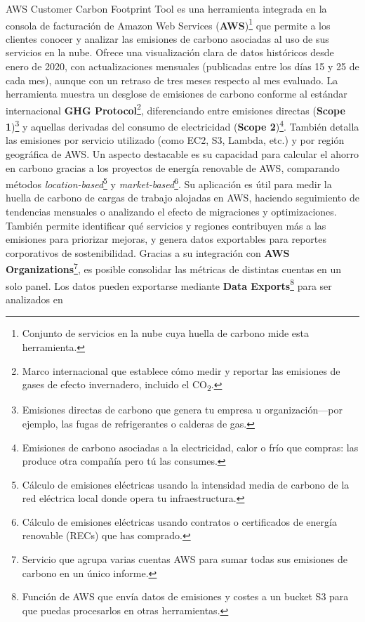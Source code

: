 \documentclass[12pt,a4paper]{report}
\begin{document}
AWS Customer Carbon Footprint Tool es una herramienta integrada en la consola
de facturación de Amazon Web Services (\textbf{AWS})\footnote{Conjunto de servicios en la nube cuya huella de carbono mide esta herramienta.} que permite a los clientes
conocer y analizar las emisiones de carbono asociadas al uso de sus servicios
en la nube. Ofrece una visualización clara de datos históricos desde enero de
2020, con actualizaciones mensuales (publicadas entre los días 15 y 25 de cada
mes), aunque con un retraso de tres meses respecto al mes evaluado. La
herramienta muestra un desglose de emisiones de carbono conforme al estándar
internacional \textbf{GHG Protocol}\footnote{Marco internacional que establece cómo medir y reportar las emisiones de gases de efecto invernadero, incluido el CO\textsubscript{2}.}, diferenciando entre emisiones directas
(\textbf{Scope 1})\footnote{Emisiones directas de carbono que genera tu empresa u organización—por ejemplo, las fugas de refrigerantes o calderas de gas.} y aquellas derivadas del consumo de electricidad
(\textbf{Scope 2})\footnote{Emisiones de carbono asociadas a la electricidad, calor o frío que compras: las produce otra compañía pero tú las consumes.}. También detalla las emisiones por servicio utilizado (como
EC2, S3, Lambda, etc.) y por región geográfica de AWS. Un aspecto destacable es
su capacidad para calcular el ahorro en carbono gracias a los proyectos de
energía renovable de AWS, comparando métodos \textit{location-based}\footnote{Cálculo de emisiones eléctricas usando la intensidad media de carbono de la red eléctrica local donde opera tu infraestructura.} y
\textit{market-based}\footnote{Cálculo de emisiones eléctricas usando contratos o certificados de energía renovable (RECs) que has comprado.}. Su aplicación es útil para medir la huella de carbono de
cargas de trabajo alojadas en AWS, haciendo seguimiento de tendencias mensuales
o analizando el efecto de migraciones y optimizaciones. También permite
identificar qué servicios y regiones contribuyen más a las emisiones para
priorizar mejoras, y genera datos exportables para reportes corporativos de
sostenibilidad. Gracias a su integración con \textbf{AWS Organizations}\footnote{Servicio que agrupa varias cuentas AWS para sumar todas sus emisiones de carbono en un único informe.}, es
posible consolidar las métricas de distintas cuentas en un solo panel. Los
datos pueden exportarse mediante \textbf{Data Exports}\footnote{Función de AWS que envía datos de emisiones y costes a un bucket S3 para que puedas procesarlos en otras herramientas.} para ser analizados en
\end{document}
